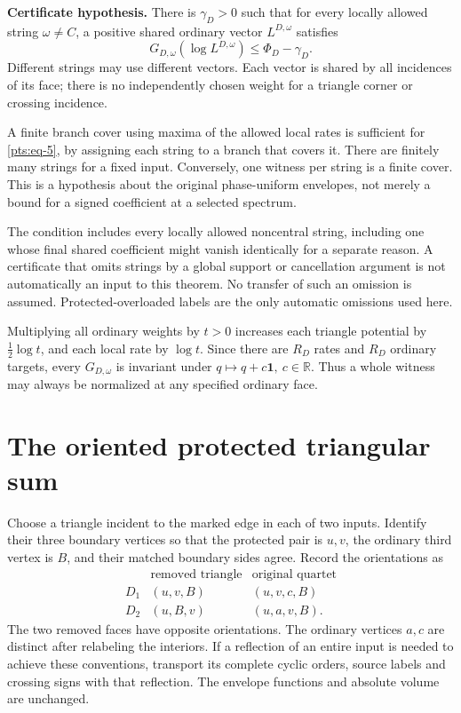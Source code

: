 \textbf{Certificate hypothesis.} There is \(\gamma_D>0\) such that for
every locally allowed string \(\omega\ne C\), a positive shared ordinary
vector \(L^{D,\omega}\) satisfies \begin{equation}\label{pts:eq-5}
G_{D,\omega}(\log L^{D,\omega})
                  \le\Phi_D-\gamma_D.
\end{equation} Different strings may use different vectors. Each vector is shared by
all incidences of its face; there is no independently chosen weight for
a triangle corner or crossing incidence.

A finite branch cover using maxima of the allowed local rates is
sufficient for \eqref{pts:eq-5}, by assigning each string to a branch that covers it.
There are finitely many strings for a fixed input. Conversely, one
witness per string is a finite cover. This is a hypothesis about the
original phase-uniform envelopes, not merely a bound for a signed
coefficient at a selected spectrum.

The condition includes every locally allowed noncentral string, including one whose final shared coefficient might vanish
identically for a separate reason. A certificate that omits strings by a
global support or cancellation argument is not automatically an input to
this theorem. No transfer of such an omission is assumed.
Protected-overloaded labels are the only automatic omissions used here.

Multiplying all ordinary weights by \(t>0\) increases each triangle
potential by \(\tfrac12\log t\), and each local rate by \(\log t\).
Since there are \(R_D\) rates and \(R_D\) ordinary targets, every \(G_{D,\omega}\) is
invariant under \(q\mapsto q+c\mathbf1,\ c\in\mathbb R\). Thus a whole witness may
always be normalized at any specified ordinary face.

\section{The oriented protected triangular
sum}\label{pts:sec-2}

Choose a triangle incident to the marked edge in each of two inputs.
Identify their three boundary vertices so that the protected pair is
\(u,v\), the ordinary third vertex is \(B\), and their matched boundary
sides agree. Record the orientations as \begin{equation}\label{pts:eq-6}
\begin{array}{c|c|c}
 &\text{removed triangle}&\text{original quartet}\\ \hline
 D_1&(u,v,B)&(u,v,c,B)\\
 D_2&(u,B,v)&(u,a,v,B).
 \end{array}
\end{equation} The two removed faces have opposite orientations. The ordinary
vertices \(a,c\) are distinct after relabeling the interiors. If a
reflection of an entire input is needed to achieve these conventions,
transport its complete cyclic orders, source labels and crossing signs
with that reflection. The envelope functions and absolute volume are
unchanged.

